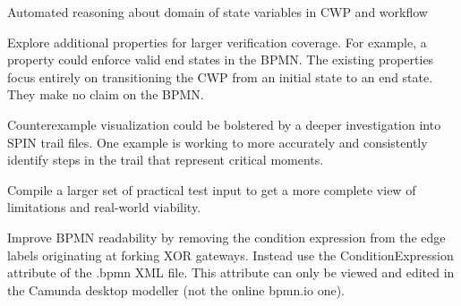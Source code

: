 Automated reasoning about domain of state variables in CWP and workflow

Explore additional properties for larger verification coverage. For example, a property could enforce valid end states in the BPMN. The existing properties focus entirely on transitioning the CWP from an initial state to an end state. They make no claim on the BPMN.

Counterexample visualization could be bolstered by a deeper investigation into SPIN trail files. One example is working to more accurately and consistently identify steps in the trail that represent critical moments.

Compile a larger set of practical test input to get a more complete view of limitations and real-world viability.

Improve BPMN readability by removing the condition expression from the edge labels originating at forking XOR gateways. Instead use the ConditionExpression attribute of the .bpmn XML file. This attribute can only be viewed and edited in the Camunda desktop modeller (not the online bpmn.io one).

